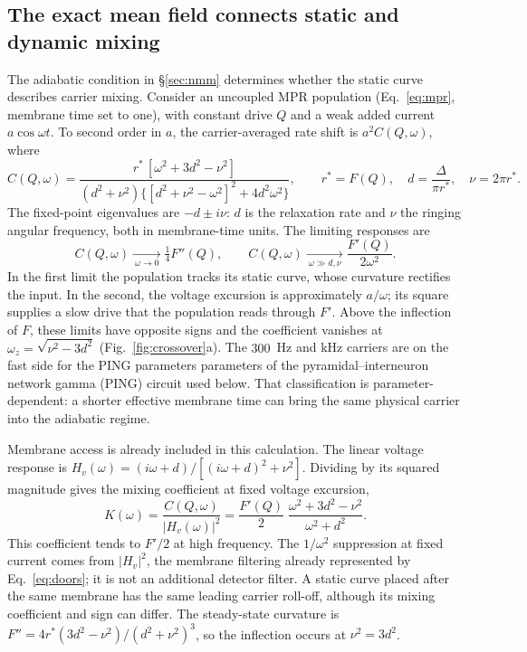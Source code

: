 \documentclass[11pt,a4paper]{article}
\providecommand{\DIFaddtex}[1]{{\protect\color{blue} \sf #1}} %
\providecommand{\DIFdeltex}[1]{{\protect\color{red} \scriptsize #1}} %
\providecommand{\DIFaddbegin}{} %
\providecommand{\DIFaddend}{} %
\providecommand{\DIFdelbegin}{} %
\providecommand{\DIFdelend}{} %
\providecommand{\DIFadd}[1]{\texorpdfstring{\DIFaddtex{#1}}{#1}} %
\providecommand{\DIFdel}[1]{\texorpdfstring{\DIFdeltex{#1}}{}} %
\begin{document}
\subsection{The exact mean field connects static and dynamic mixing}\label{sec:dynamic}
The adiabatic condition in \S\ref{sec:nmm} determines whether the static curve describes
carrier mixing. Consider an uncoupled MPR population (Eq.~\eqref{eq:mpr}, membrane
time set to one), with constant drive $Q$ and a weak added current $a\cos\omega t$.
To second order in $a$, the carrier-averaged rate shift is $a^2C(Q,\omega)$, where
\begin{equation}
C(Q,\omega)=\frac{r^*\,[\omega^2+3d^2-\nu^2]}{(d^2+\nu^2)\{[d^2+\nu^2-\omega^2]^2+4d^2\omega^2\}},
\qquad r^*=F(Q),\quad d=\frac{\Delta}{\pi r^*},\quad \nu=2\pi r^*.
\label{eq:crossover}
\end{equation}
The fixed-point eigenvalues are $-d\pm i\nu$: $d$ is the relaxation rate and $\nu$
the ringing angular frequency, both in membrane-time units. The limiting responses are
\begin{equation}
C(Q,\omega)\xrightarrow[\ \omega\to0\ ]{}\tfrac14F''(Q),\qquad
C(Q,\omega)\xrightarrow[\ \omega\gg d,\nu\ ]{}\frac{F'(Q)}{2\omega^2}.
\label{eq:crossover_limits}
\end{equation}
In the first limit the population tracks its static curve, whose curvature rectifies
the input. In the second, the voltage excursion is approximately $a/\omega$; its
square supplies a slow drive that the population reads through $F'$. Above the
inflection of $F$, these limits have opposite signs and the coefficient vanishes at
$\omega_z=\sqrt{\nu^2-3d^2}$ (Fig.~\ref{fig:crossover}a). The $300$~Hz and kHz carriers
are on the fast side for the \DIFdelbegin \DIFdel{PING parameters }\DIFdelend \DIFaddbegin \DIFadd{parameters of the pyramidal--interneuron network gamma
(PING) circuit }\DIFaddend used below. That classification is
parameter-dependent: a shorter effective membrane time can bring the same physical
carrier into the adiabatic regime.

Membrane access is already included in this calculation. The linear voltage response
is $H_v(\omega)=(i\omega+d)/[(i\omega+d)^2+\nu^2]$. Dividing by its squared magnitude
gives the mixing coefficient at fixed voltage excursion,
\begin{equation}
K(\omega)=\frac{C(Q,\omega)}{|H_v(\omega)|^2}
=\frac{F'(Q)}{2}\;\frac{\omega^2+3d^2-\nu^2}{\omega^2+d^2}.
\label{eq:kfixed}
\end{equation}
This coefficient tends to $F'/2$ at high frequency. The $1/\omega^2$ suppression
at fixed current comes from $|H_v|^2$, the membrane filtering already represented
by Eq.~\eqref{eq:doors}; it is not an additional detector filter. A static curve
placed after the same membrane has the same leading carrier roll-off, although
its mixing coefficient and sign can differ. The steady-state curvature is
$F''=4r^*(3d^2-\nu^2)/(d^2+\nu^2)^3$, so the inflection occurs at $\nu^2=3d^2$.
\end{document}
